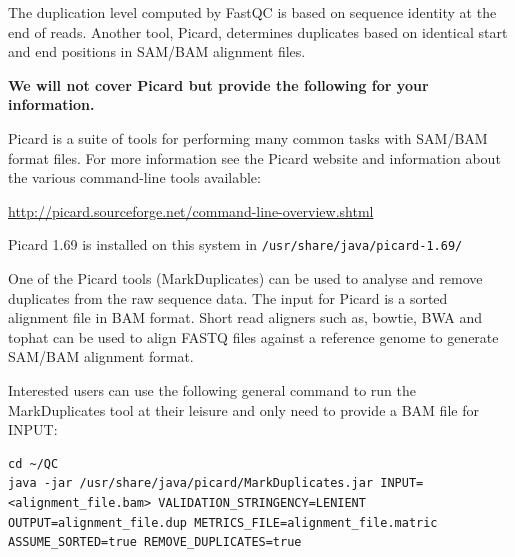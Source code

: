 \begin{advanced}
\begin{information}
The duplication level computed by FastQC is based on sequence identity at the
end of reads. Another tool, Picard, determines duplicates based on identical
start and end positions in SAM/BAM alignment files.

\textbf{We will not cover Picard but
provide the following for your information.}

Picard is a suite of tools for performing many common tasks with SAM/BAM format
files. For more information see the Picard website and information about the
various command-line tools available:

\url{http://picard.sourceforge.net/command-line-overview.shtml}
\end{information}

\begin{information}
Picard 1.69 is installed on this system in \texttt{/usr/share/java/picard-1.69/}

One of the Picard tools (MarkDuplicates) can be used to analyse and remove
duplicates from the raw sequence data. The input for Picard is a sorted
alignment file in BAM format. Short read aligners such as, bowtie, BWA and tophat
can be used to align FASTQ files against a reference genome to generate
SAM/BAM alignment format.
\end{information}

\begin{steps}
Interested users can use the following general command to run the
MarkDuplicates tool at their leisure and only need to provide a BAM file for
INPUT:


\begin{lstlisting}
cd ~/QC
java -jar /usr/share/java/picard/MarkDuplicates.jar INPUT=<alignment_file.bam> VALIDATION_STRINGENCY=LENIENT OUTPUT=alignment_file.dup METRICS_FILE=alignment_file.matric ASSUME_SORTED=true REMOVE_DUPLICATES=true

\end{lstlisting}
\end{steps}

\end{advanced}
